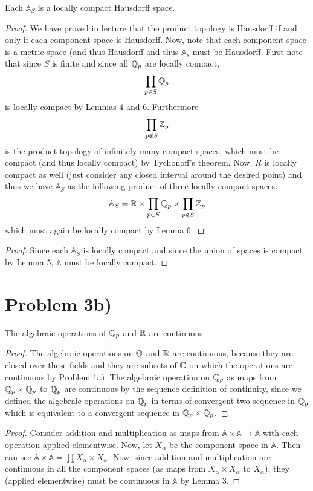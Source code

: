 \begin{lemma}
Each $\mathbb{A}_S$ is a locally compact Hausdorff space. 
\begin{proof}
We have proved in lecture that the product topology is Hausdorff if and only if each component space is Hausdorff. Now, note that each component space is a metric space (and thus Hausdorff and thus $\mathbb{A}_s$ must be Hausdorff. 
First note that since $S$ is finite and since all $\mathbb{Q}_p$ are locally compact,
\[ \prod_{p\in S} \mathbb{Q}_p \]
is locally compact by Lemmas 4 and 6. 
Furthermore 
\[ \prod_{p\notin S} \mathbb{Z}_p \]
is the product topology of infinitely many compact spaces, which must be compact (and thus locally compact) by Tychonoff's theorem.
Now, $R$ is locally compact as well (just consider any closed interval around the desired point) and thus we have $\mathbb{A}_S$ as the following product of three locally compact spaces:
\[ \mathbb{A}_S = \mathbb{R}\times\prod_{p\in S} \mathbb{Q}_p \times \prod_{p\notin S} \mathbb{Z}_p \]
which must again be locally compact by Lemma 6. 
\end{proof}
\end{lemma}
\begin{proof}
Since each $\mathbb{A}_S$ is locally compact and since the union of spaces is compact by Lemma 5, $\mathbb{A}$ must be locally compact. 
\end{proof}
\section*{Problem 3b)}
\begin{lemma}
The algebraic operations of $\mathbb{Q}_p$ and $\mathbb{R}$ are continuous
\begin{proof}
The algebraic operations on $\mathbb{Q}$ and $\mathbb{R}$ are continuous, because they are closed over these fields and they are subsets of $\mathbb{C}$ on which the operations are continuous by Problem 1a). 
The algebraic operation on $\mathbb{Q}_p$ as maps from $\mathbb{Q}_p\times \mathbb{Q}_p$ to $\mathbb{Q}_p$ are continuous by the sequence definition of continuity, since we defined the algebraic operations  on $\mathbb{Q}_p$ in terms of convergent two sequence in $\mathbb{Q}_p$ which is equivalent to a convergent sequence in $\mathbb{Q}_p\times \mathbb{Q}_p$.
\end{proof}
\end{lemma}
\begin{proof}
Consider addition and multiplication as maps from $\mathbb{A} \times \mathbb{A} \to \mathbb{A}$ with each operation applied elementwise. Now, let $X_\alpha$ be the component space in $\mathbb{A}$. Then can see $\mathbb{A} \times \mathbb{A} \tilde{=} \prod X_\alpha \times X_\alpha$. 
Now, since addition and multiplication are continuous in all the component spaces (as maps from $X_\alpha \times X_\alpha$ to $X_\alpha$), they (applied elementwise) must be continuous in $\mathbb{A}$ by Lemma 3. 
\end{proof}

